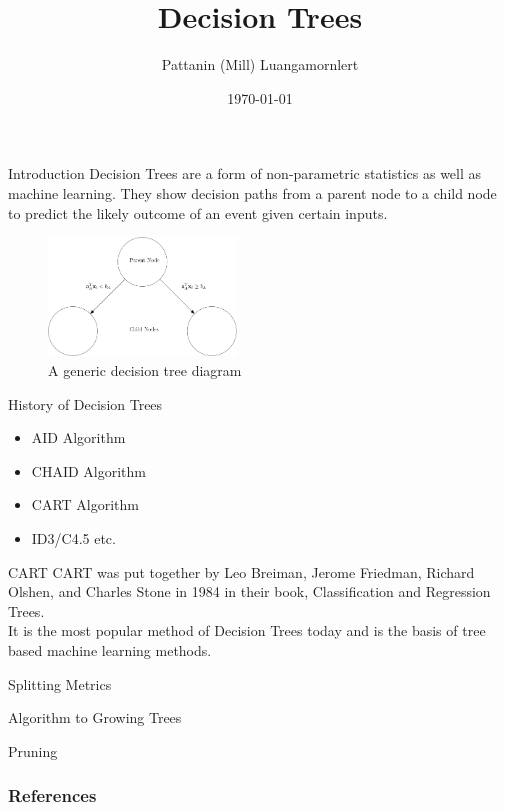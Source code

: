 \documentclass[12pt]{beamer}
\title{Decision Trees}
\author{Pattanin (Mill) Luangamornlert}
\institute{Durham University}
\date{\today}
\begin{document}
\frame{\titlepage}

\begin{frame}{Introduction}
   Decision Trees are a form of non-parametric statistics as well as machine learning. They show decision paths from a parent node to a child node to predict the likely outcome of an event given certain inputs.
   \begin{figure}
       \centering
       \includegraphics[width = 5cm]{ipefile/basicdt.png}
       \caption{A generic decision tree diagram}
       \label{fig:basicdt}
   \end{figure}
\end{frame}


\begin{frame}{History of Decision Trees}
    \begin{itemize}
        \item<1-> AID Algorithm \cite{AID}
        
        \item<2-> CHAID Algorithm \cite{CHAID}
        
        \item<3-> CART Algorithm \cite{BreimanDT}
        
        \item<4> ID3/C4.5 etc. \cite{Quinlan}
    \end{itemize}
\end{frame}

\begin{frame}{CART}
    CART was put together by Leo Breiman, Jerome Friedman, Richard Olshen, and Charles Stone in 1984 in their book, Classification and Regression Trees.\\
    It is the most popular method of Decision Trees today and is the basis of tree based machine learning methods.
\end{frame}

\begin{frame}{Splitting Metrics}
    
\end{frame}

\begin{frame}{Algorithm to Growing Trees}
    
\end{frame}

\begin{frame}{Pruning}
    
\end{frame}

\begin{frame}[allowframebreaks]
        \frametitle{References}
        
        
\end{frame}
\end{document}
